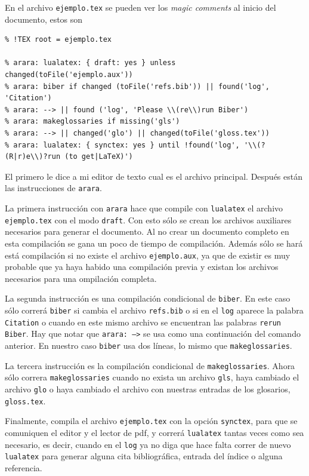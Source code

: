 En el archivo \texttt{ejemplo.tex} se pueden ver los \textit{magic comments} al inicio del documento, estos son
\begin{verbatim}
% !TEX root = ejemplo.tex

% arara: lualatex: { draft: yes } unless changed(toFile('ejemplo.aux'))
% arara: biber if changed (toFile('refs.bib')) || found('log', 'Citation')
% arara: --> || found ('log', 'Please \\(re\\)run Biber')
% arara: makeglossaries if missing('gls')
% arara: --> || changed('glo') || changed(toFile('gloss.tex'))
% arara: lualatex: { synctex: yes } until !found('log', '\\(?(R|r)e\\)?run (to get|LaTeX)')
\end{verbatim}
El primero le dice a mi editor de texto cual es el archivo principal. Después
están las instrucciones de \texttt{arara}.

La primera instrucción con \texttt{arara} hace que compile con
\texttt{lualatex} el archivo \texttt{ejemplo.tex} con el modo \texttt{draft}.
Con esto sólo se crean los archivos auxiliares necesarios para generar el
documento. Al no crear un documento completo en esta compilación se gana un
poco de tiempo de compilación. Además sólo se hará está compilación si no
existe el archivo \texttt{ejemplo.aux}, ya que de existir es muy probable que
ya haya habido una compilación previa y existan los archivos necesarios para
una ompilación completa.

La segunda instrucción es una compilación condicional de \texttt{biber}. En
este caso sólo correrá \texttt{biber} si cambia el archivo \texttt{refs.bib} o
si en el \texttt{log} aparece la palabra \texttt{Citation} o cuando en este
mismo archivo se encuentran las palabras \texttt{rerun Biber}. Hay que notar
que \texttt{arara: -->} se usa como una continuación del comando anterior. En
nuestro caso \texttt{biber} usa dos líneas, lo mismo que
\texttt{makeglossaries}.

La tercera instrucción es la compilación condicional de
\texttt{makeglossaries}. Ahora sólo correra \texttt{makeglossaries} cuando no
exista un archivo \texttt{gls}, haya cambiado el archivo \texttt{glo} o haya
cambiado el archivo con nuestras entradas de los glosarios, \texttt{gloss.tex}.

Finalmente, compila el archivo \texttt{ejemplo.tex} con la opción \texttt{synctex}, para que se comuniquen el editor y el lector de pdf, y correrá \texttt{lualatex} tantas veces como sea necesario, es decir, cuando en el \texttt{log} ya no diga que hace falta correr de nuevo \texttt{lualatex} para generar alguna cita bibliográfica, entrada del índice o alguna referencia.

